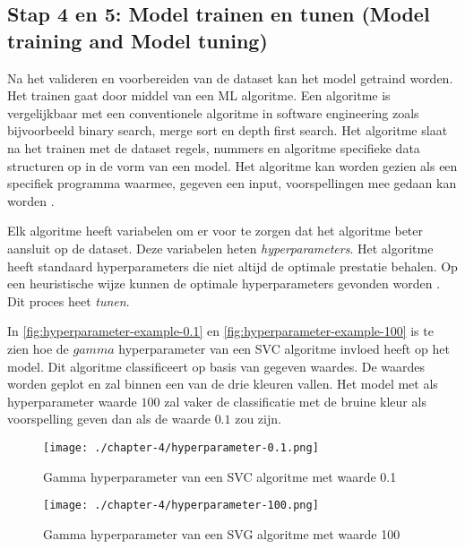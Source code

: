 \subsection{Stap 4 en 5: Model trainen en tunen (Model training and Model tuning)}\label{subsec:ch4-model-trainen-en-tunen}
Na het valideren en voorbereiden van de dataset kan het model getraind worden. Het trainen gaat door middel van een ML algoritme. Een algoritme is vergelijkbaar met een conventionele algoritme in software engineering zoals bijvoorbeeld binary search, merge sort en depth first search. Het algoritme slaat na het trainen met de dataset regels, nummers en algoritme specifieke data structuren op in de vorm van een model. Het algoritme kan worden gezien als een specifiek programma waarmee, gegeven een input, voorspellingen mee gedaan kan worden \cite{ml-algorithm-model-difference}.

Elk algoritme heeft variabelen om er voor te zorgen dat het algoritme beter aansluit op de dataset. Deze variabelen heten \textit{hyperparameters}. Het algoritme heeft standaard hyperparameters die niet altijd de optimale prestatie behalen. Op een heuristische wijze kunnen de optimale hyperparameters gevonden worden \cite{ml-model-hyper-parameter-brownlee}. Dit proces heet \textit{tunen}.

In \autoref{fig:hyperparameter-example-0.1} en \autoref{fig:hyperparameter-example-100} is te zien hoe de \(gamma\) hyperparameter van een SVC algoritme invloed heeft op het model. Dit algoritme classificeert op basis van gegeven waardes. De waardes worden geplot en zal binnen een van de drie kleuren vallen. Het model met als hyperparameter waarde \(100\) zal vaker de classificatie met de bruine kleur als voorspelling geven dan als de waarde \(0.1\) zou zijn.

\begin{figure}[hbt!]
  \centering
  \begin{minipage}{0.45\textwidth}
      \centering
      \texttt{[image: ./chapter-4/hyperparameter-0.1.png]}
      \caption{Gamma hyperparameter van een SVC algoritme met waarde 0.1}
      \label{fig:hyperparameter-example-0.1}
  \end{minipage}\hfill
  \begin{minipage}{0.45\textwidth}
      \centering
      \texttt{[image: ./chapter-4/hyperparameter-100.png]}
      \caption{Gamma hyperparameter van een SVG algoritme met waarde 100}
      \label{fig:hyperparameter-example-100}
  \end{minipage}
\end{figure}

